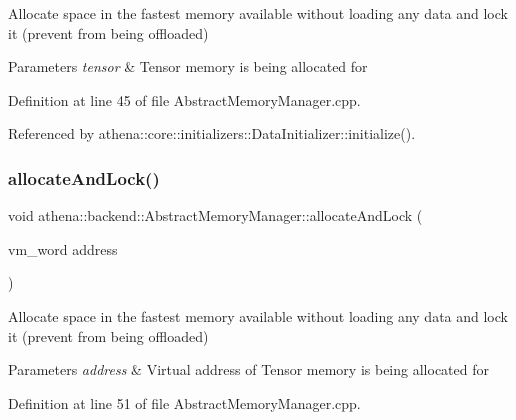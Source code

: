 Allocate space in the fastest memory available without loading any data and lock it (prevent from being offloaded) 
\begin{DoxyParams}{Parameters}
{\em tensor} & Tensor memory is being allocated for \\
\hline
\end{DoxyParams}


Definition at line 45 of file Abstract\+Memory\+Manager.\+cpp.



Referenced by athena\+::core\+::initializers\+::\+Data\+Initializer\+::initialize().

\mbox{\label{classathena_1_1backend_1_1_abstract_memory_manager_ab5305b3d1ab91960bf179ce0be166120}} 
\subsubsection{\texorpdfstring{allocate\+And\+Lock()}{allocateAndLock()}\hspace{0.1cm}{\footnotesize\ttfamily [2/3]}}
{\footnotesize\ttfamily void athena\+::backend\+::\+Abstract\+Memory\+Manager\+::allocate\+And\+Lock (\begin{DoxyParamCaption}\item[{vm\+\_\+word}]{address }\end{DoxyParamCaption})}

Allocate space in the fastest memory available without loading any data and lock it (prevent from being offloaded) 
\begin{DoxyParams}{Parameters}
{\em address} & Virtual address of Tensor memory is being allocated for \\
\hline
\end{DoxyParams}


Definition at line 51 of file Abstract\+Memory\+Manager.\+cpp.

\mbox{\label{classathena_1_1backend_1_1_abstract_memory_manager_a1b80008e94c21d5ac87f9a45d3f212a8}} 
